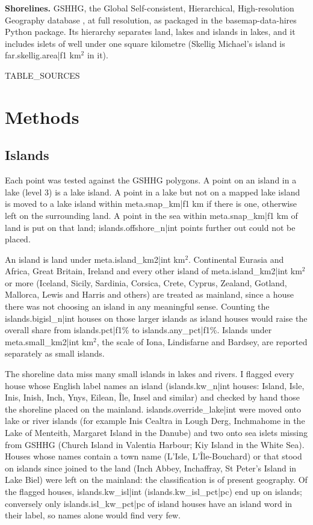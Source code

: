 \documentclass[11pt,a4paper]{article}
\begin{document}
\textbf{Shorelines.} GSHHG, the Global Self-consistent, Hierarchical, High-resolution Geography database \citep{gshhg}, at full resolution, as packaged in the basemap-data-hires Python package. Its hierarchy separates land, lakes and islands in lakes, and it includes islets of well under one square kilometre (Skellig Michael's island is {{far.skellig.area|f1}} km$^2$ in it).

{{TABLE_SOURCES}}

\section{Methods}
\subsection{Islands}
Each point was tested against the GSHHG polygons. A point on an island in a lake (level 3) is a lake island. A point in a lake but not on a mapped lake island is moved to a lake island within {{meta.snap_km|f1}} km if there is one, otherwise left on the surrounding land. A point in the sea within {{meta.snap_km|f1}} km of land is put on that land; {{islands.offshore_n|int}} points further out could not be placed.

An island is land under {{meta.island_km2|int}} km$^2$. Continental Eurasia and Africa, Great Britain, Ireland and every other island of {{meta.island_km2|int}} km$^2$ or more (Iceland, Sicily, Sardinia, Corsica, Crete, Cyprus, Zealand, Gotland, Mallorca, Lewis and Harris and others) are treated as mainland, since a house there was not choosing an island in any meaningful sense. Counting the {{islands.bigisl_n|int}} houses on those larger islands as island houses would raise the overall share from {{islands.pct|f1}}\% to {{islands.any_pct|f1}}\%. Islands under {{meta.small_km2|int}} km$^2$, the scale of Iona, Lindisfarne and Bardsey, are reported separately as small islands.

The shoreline data miss many small islands in lakes and rivers. I flagged every house whose English label names an island ({{islands.kw_n|int}} houses: Island, Isle, Inis, Inish, Inch, Ynys, Eilean, Île, Insel and similar) and checked by hand those the shoreline placed on the mainland. {{islands.override_lake|int}} were moved onto lake or river islands (for example Inis Cealtra in Lough Derg, Inchmahome in the Lake of Menteith, Margaret Island in the Danube) and two onto sea islets missing from GSHHG (Church Island in Valentia Harbour; Kiy Island in the White Sea). Houses whose names contain a town name (L'Isle, L'Île-Bouchard) or that stood on islands since joined to the land (Inch Abbey, Inchaffray, St Peter's Island in Lake Biel) were left on the mainland: the classification is of present geography. Of the flagged houses, {{islands.kw_isl|int}} ({{islands.kw_isl_pct|pc}}) end up on islands; conversely only {{islands.isl_kw_pct|pc}} of island houses have an island word in their label, so names alone would find very few.
\end{document}
